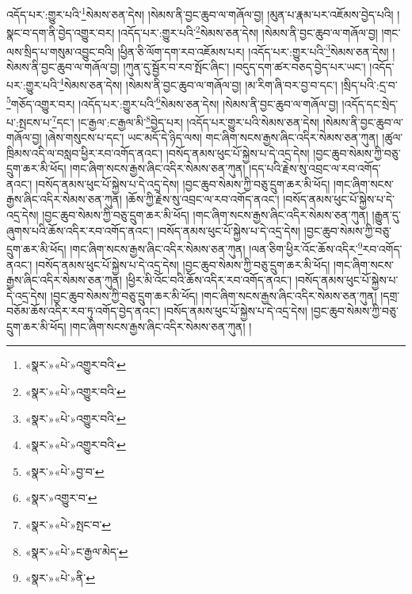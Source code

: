 འདོད་པར་:གྱུར་པའི་\footnote{«སྣར་»«པེ་»འགྱུར་བའི་}སེམས་ཅན་དེས། །སེམས་ནི་བྱང་ཆུབ་ལ་གཞོལ་བྱ། །མུན་པ་རྣམ་པར་འཇོམས་བྱེད་པའི། །སྣང་བ་དག་ནི་བྱེད་འགྱུར་བར། །འདོད་པར་:གྱུར་པའི་\footnote{«སྣར་»«པེ་»འགྱུར་བའི་}སེམས་ཅན་དེས། །སེམས་ནི་བྱང་ཆུབ་ལ་གཞོལ་བྱ། །གང་ལས་སྲིད་པ་གསུམ་འབྱུང་བའི། །ཕྱིན་ཅི་ལོག་དག་རབ་འཇོམས་པར། །འདོད་པར་:གྱུར་པའི་\footnote{«སྣར་»«པེ་»འགྱུར་བའི་}སེམས་ཅན་དེས། །སེམས་ནི་བྱང་ཆུབ་ལ་གཞོལ་བྱ། །ཀུན་དུ་སྦྱོར་བ་རབ་སྤོང་ཞིང་། །བདུད་དག་ཚར་བཅད་བྱེད་པར་ཡང་། །འདོད་པར་:གྱུར་པའི་\footnote{«སྣར་»«པེ་»འགྱུར་བའི་}སེམས་ཅན་དེས། །སེམས་ནི་བྱང་ཆུབ་ལ་གཞོལ་བྱ། །མ་རིག་ཞི་བར་བྱ་བ་དང་། །སྲིད་པའི་:དྲ་བ་\footnote{«སྣར་»«པེ་»བྱ་བ་}གཅོད་འགྱུར་བར། །འདོད་པར་:གྱུར་པའི་\footnote{«སྣར་»འགྱུར་བ་}སེམས་ཅན་དེས། །སེམས་ནི་བྱང་ཆུབ་ལ་གཞོལ་བྱ། །འདོད་དང་སྲེད་པ་:སྤངས་པ་\footnote{«སྣར་»«པེ་»སྤང་བ་}དང་། །ང་རྒྱལ་:ང་རྒྱལ་མི་\footnote{«སྣར་»«པེ་»ང་རྒྱལ་མེད་}བྱེད་པར། །འདོད་པར་གྱུར་པའི་སེམས་ཅན་དེས། །སེམས་ནི་བྱང་ཆུབ་ལ་གཞོལ་བྱ། །ཞེས་གསུངས་པ་དང་། ཡང་མདོ་དེ་ཉིད་ལས། གང་ཞིག་སངས་རྒྱས་ཞིང་འདིར་སེམས་ཅན་ཀུན། །ཚུལ་ཁྲིམས་འདི་ལ་བསླབ་ཕྱིར་རབ་འགོད་ནའང་། །བསོད་ནམས་ཕུང་པོ་སྐྱེས་པ་དེ་འདྲ་དེས། །བྱང་ཆུབ་སེམས་ཀྱི་བཅུ་དྲུག་ཆར་མི་ཕོད། །གང་ཞིག་སངས་རྒྱས་ཞིང་འདིར་སེམས་ཅན་ཀུན། །དད་པའི་རྗེས་སུ་འབྲང་ལ་རབ་འགོད་ནའང་། །བསོད་ནམས་ཕུང་པོ་སྐྱེས་པ་དེ་འདྲ་དེས། །བྱང་ཆུབ་སེམས་ཀྱི་བཅུ་དྲུག་ཆར་མི་ཕོད། །གང་ཞིག་སངས་རྒྱས་ཞིང་འདིར་སེམས་ཅན་ཀུན། །ཆོས་ཀྱི་རྗེས་སུ་འབྲང་ལ་རབ་འགོད་ནའང་། །བསོད་ནམས་ཕུང་པོ་སྐྱེས་པ་དེ་འདྲ་དེས། །བྱང་ཆུབ་སེམས་ཀྱི་བཅུ་དྲུག་ཆར་མི་ཕོད། །གང་ཞིག་སངས་རྒྱས་ཞིང་འདིར་སེམས་ཅན་ཀུན། །རྒྱུན་དུ་ཞུགས་པའི་ཆོས་འདིར་རབ་འགོད་ནའང་། །བསོད་ནམས་ཕུང་པོ་སྐྱེས་པ་དེ་འདྲ་དེས། །བྱང་ཆུབ་སེམས་ཀྱི་བཅུ་དྲུག་ཆར་མི་ཕོད། །གང་ཞིག་སངས་རྒྱས་ཞིང་འདིར་སེམས་ཅན་ཀུན། །ལན་ཅིག་ཕྱིར་འོང་ཆོས་འདིར་\footnote{«སྣར་»«པེ་»ནི་}རབ་འགོད་ནའང་། །བསོད་ནམས་ཕུང་པོ་སྐྱེས་པ་དེ་འདྲ་དེས། །བྱང་ཆུབ་སེམས་ཀྱི་བཅུ་དྲུག་ཆར་མི་ཕོད། །གང་ཞིག་སངས་རྒྱས་ཞིང་འདིར་སེམས་ཅན་ཀུན། །ཕྱིར་མི་འོང་བའི་ཆོས་འདིར་རབ་འགོད་ནའང་། །བསོད་ནམས་ཕུང་པོ་སྐྱེས་པ་དེ་འདྲ་དེས། །བྱང་ཆུབ་སེམས་ཀྱི་བཅུ་དྲུག་ཆར་མི་ཕོད། །གང་ཞིག་སངས་རྒྱས་ཞིང་འདིར་སེམས་ཅན་ཀུན། །དགྲ་བཅོམ་ཆོས་འདིར་རབ་ཏུ་འགོད་བྱེད་ནའང་། །བསོད་ནམས་ཕུང་པོ་སྐྱེས་པ་དེ་འདྲ་དེས། །བྱང་ཆུབ་སེམས་ཀྱི་བཅུ་དྲུག་ཆར་མི་ཕོད། །གང་ཞིག་སངས་རྒྱས་ཞིང་འདིར་སེམས་ཅན་ཀུན། །
